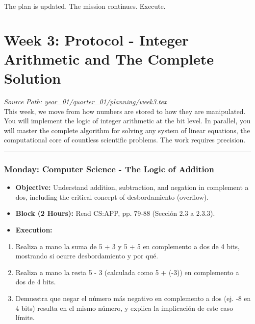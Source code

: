 \documentclass[11pt,a4paper]{report}
\begin{document}
The plan is updated. The mission continues. Execute.

\newpage
\section{Week 3: Protocol - Integer Arithmetic and The Complete Solution}
\noindent\textit{Source Path: \href{https://github.com/TEGDV/QuantitativeSystemsEngineering/blob/main/year_01/quarter_01/planning/week3.tex}{year\_01/quarter\_01/planning/week3.tex}}\\


This week, we move from how numbers are stored to how they are manipulated. You will implement the logic of integer arithmetic at the bit level. In parallel, you will master the complete algorithm for solving any system of linear equations, the computational core of countless scientific problems. The work requires precision.

\noindent\rule{\textwidth}{0.4pt}

\subsubsection{\textbf{Monday: Computer Science - The Logic of Addition}}
\begin{itemize}
  \item \textbf{Objective:} Understand addition, subtraction, and negation in complement a dos, including the critical concept of desbordamiento (overflow).
  \item \textbf{Block (2 Hours):} Read CS:APP, pp. 79-88 (Sección 2.3 a 2.3.3).
  \item \textbf{Execution:}
\end{itemize}
\begin{enumerate}
  \item Realiza a mano la suma de 5 + 3 y 5 + 5 en complemento a dos de 4 bits, mostrando si ocurre desbordamiento y por qué.
  \item Realiza a mano la resta 5 - 3 (calculada como 5 + (-3)) en complemento a dos de 4 bits.
  \item Demuestra que negar el número más negativo en complemento a dos (ej. -8 en 4 bits) resulta en el mismo número, y explica la implicación de este caso límite.

\end{enumerate}
\end{document}
